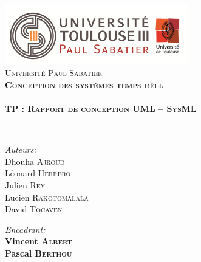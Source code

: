 
\begin{titlepage}
\begin{center}


\includegraphics[width=0.60\textwidth]{./page_de_garde/logo_ups.png}~\\[1cm]

\textsc{\LARGE Université Paul Sabatier}\\[1.5cm]

\textsc{\Large \bf Conception des systèmes temps réel }\\[0.5cm]

\HRule \\[0.4cm]

{\huge \bfseries  TP : \textsc{Rapport de conception UML -- SysML} }

\HRule \\[1.5cm]

\begin{minipage}[t]{0.4\textwidth}
\begin{flushleft} \large
\emph{Auteurs:}\\ \vspace{3mm}
Dhouha \textsc{Ajroud}\\
Léonard \textsc{Herrero}\\
Julien \textsc{Rey}\\
Lucien \textsc{Rakotomalala}\\
David \textsc{Tocaven}
\end{flushleft}
\end{minipage}
\begin{minipage}[t]{0.58\textwidth}
\begin{flushright} \large
\emph{Encadrant:}\\ \vspace{3mm}
\textbf{ Vincent \textsc{Albert}}\\
\textbf{Pascal \textsc{Berthou}}\\
\vfill
\end{flushright}
\end{minipage}
\newline
\newline


\end{center}
\end{titlepage}
